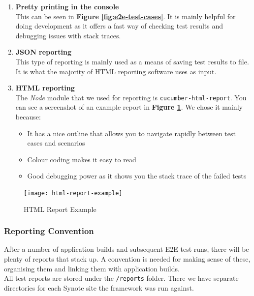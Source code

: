 \begin{enumerate}

\item \textbf{Pretty printing in the console}
\\
This can be seen in \textbf{Figure \ref{fig:e2e-test-cases}}. It is mainly helpful for doing development as it offers a fast way of checking test results and debugging issues with stack traces.

\item \textbf{JSON reporting}
\\
This type of reporting is mainly used as a means of saving test results to file. It is what the majority of HTML reporting software uses as input.

\item \textbf{HTML reporting}
\\
The \textit{Node} module that we used for reporting is \texttt{cucumber-html-report}. You can see a screenshot of an example report in \textbf{Figure \ref{fig:html-report-example}}. We chose it mainly because:

\begin{itemize}
\item It has a nice outline that allows you to navigate rapidly between test cases and scenarios
\item Colour coding makes it easy to read
\item Good debugging power as it shows you the stack trace of the failed tests
\end{itemize}

\end{enumerate}

\begin{figure}[!hbt]
  	\centering
 	\texttt{[image: html-report-example]}
  	\caption{HTML Report Example}
 	\label{fig:html-report-example}
\end{figure}

\subsubsection{Reporting Convention}
\label{subsubsec:reporting-convention}

After a number of application builds and subsequent E2E test runs, there will be plenty of reports that stack up. A convention is needed for making sense of these, organising them and linking them with application builds.
\\

All test reports are stored under the \texttt{/reports} folder. There we have separate directories for each Synote site the framework was run against.
\\

